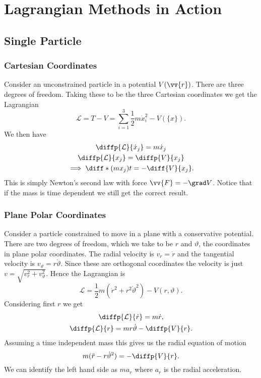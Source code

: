 \documentclass[fleqn]{NotesClass}
\newcommand*{\lagrangian}{\mathcal{L}}
\begin{document}
    \chapter{Lagrangian Methods in Action}
    \section{Single Particle}
    \subsection{Cartesian Coordinates}
    Consider an unconstrained particle in a potential \(V(\vv{r})\).
    There are three degrees of freedom.
    Taking these to be the three Cartesian coordinates we get the Lagrangian
    \begin{equation}
        \lagrangian = T - V = \sum_{i=1}^{3} \frac{1}{2}m\dot{x}_i^2 - V(\{x\}).
    \end{equation}
    We then have
    \begin{gather}
        \diffp{\lagrangian}{\dot{x}_j} = m\dot{x}_j\\
        \diffp{\lagrangian}{x_j} = \diffp{V}{x_j}\\
        \implies \diff*{(mx_j)}{t} = -\diff{V}{x_j}.
    \end{gather}
    This is simply Newton's second law with force \(\vv{F} = -\grad V\).
    Notice that if the mass is time dependent we still get the correct result.
    
    \subsection{Plane Polar Coordinates}
    Consider a particle constrained to move in a plane with a conservative potential.
    There are two degrees of freedom, which we take to be \(r\) and \(\vartheta\), the coordinates in plane polar coordinates.
    The radial velocity is \(v_r = \dot{r}\) and the tangential velocity is \(v_{\vartheta} = r\dot{\vartheta}\).
    Since these are orthogonal coordinates the velocity is just \(v = \sqrt{v_r^2 + v_\vartheta^2}\).
    Hence the Lagrangian is
    \begin{equation}
        \lagrangian = \frac{1}{2}m(\dot{r}^2 + r^2\dot{\vartheta}^2) - V(r, \vartheta).
    \end{equation}
    Considering first \(r\) we get
    \begin{gather}
        \diffp{\lagrangian}{\dot{r}} = m\dot{r},\\
        \diffp{\lagrangian}{r} = mr\dot{\vartheta} - \diffp{V}{r}.
    \end{gather}
    Assuming a time independent mass this gives us the radial equation of motion
    \begin{equation}
        m(\ddot{r} - r\dot{\vartheta}^2) = -\diffp{V}{r}.
    \end{equation}
    We can identify the left hand side as \(ma_r\) where \(a_r\) is the radial acceleration.
    
\end{document}
